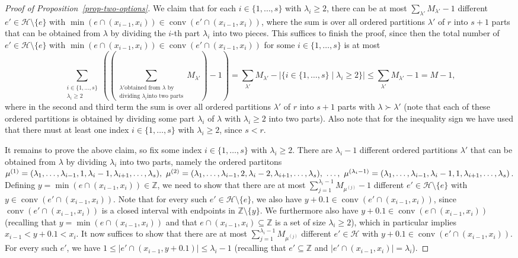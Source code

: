 \documentclass[10pt,a4paper]{amsart}
\theoremstyle{definition}
\newcommand{\su}{\subseteq}
\newcommand{\sm}{\setminus}
\newcommand{\Z}{\mathbb{Z}}
\newcommand{\HH}{\mathcal{H}}
\newcommand{\conv}{\operatorname{conv}}
\begin{document}
\begin{proof}[Proof of Proposition~\ref{prop-two-options}]
We claim that for each $i\in\{1,\dots,s\}$ with $\lambda_i\ge 2$, there can be at most $\sum_{\lambda'} M_{\lambda'}-1$ different $e'\in\HH\sm\{e\}$ with $\min(e\cap (x_{i-1},x_i))\in \conv(e'\cap (x_{i-1},x_i))$, where the sum is over all ordered partitions $\lambda'$ of $r$ into $s+1$ parts that can be obtained from $\lambda$ by dividing the $i$-th part $\lambda_i$ into two pieces. This suffices to finish the proof, since then the total number of $e'\in\HH\sm\{e\}$ with $\min(e\cap (x_{i-1},x_i))\in \conv(e'\cap (x_{i-1},x_i))$ for some $i\in\{1,\dots,s\}$ is at most
\[\sum_{\substack{i\in\{1,\dots,s\}\\\lambda_i\ge 2}}\left(\left(\sum_{\substack{\lambda'\text{obtained from }\lambda\text{ by}\\\text{dividing }\lambda_i\text{into two parts}}}\!\!M_{\lambda'}\right)-1\right)=\sum_{\lambda'} M_{\lambda'}-|\{i\in\{1,\dots,s\}\mid \lambda_i\ge 2\}|\le \sum_{\lambda'} M_{\lambda'}-1=M-1,\]
where in the second and third term the sum is over all ordered partitions $\lambda'$ of $r$ into $s+1$ parts with $\lambda\succ\lambda'$ (note that each of these ordered partitions is obtained by dividing some part $\lambda_i$ of $\lambda$ with $\lambda_i\ge 2$ into two parts). Also note that for the inequality sign we have used that there must at least one index $i\in \{1,\dots,s\}$ with $\lambda_i\ge 2$, since $s<r$.

It remains to prove the above claim, so fix some index $i\in\{1,\dots,s\}$ with $\lambda_i\ge 2$. There are $\lambda_i-1$ different ordered partitions $\lambda'$ that can be obtained from $\lambda$ by dividing $\lambda_i$ into two parts, namely the ordered partitons $\mu^{(1)}=(\lambda_1,\dots,\lambda_{i-1},1,\lambda_i-1,\lambda_{i+1},\dots,\lambda_s), \ \mu^{(2)}=(\lambda_1,\dots,\lambda_{i-1},2,\lambda_i-2,\lambda_{i+1},\dots,\lambda_s),\ \dots,\ \linebreak \mu^{(\lambda_i-1)}=(\lambda_1,\dots,\lambda_{i-1},\lambda_i-1,1,\lambda_{i+1},\dots,\lambda_s)$. Defining $y=\min(e\cap (x_{i-1},x_i))\in \Z$, we need to show that there are at most $\sum_{j=1}^{\lambda_i-1} M_{\mu^{(j)}}-1$ different $e'\in\HH\sm\{e\}$ with $y\in \conv(e'\cap (x_{i-1},x_i))$. Note that for every such $e'\in\HH\sm\{e\}$, we also have $y+0.1\in \conv(e'\cap (x_{i-1},x_i))$, since $\conv(e'\cap (x_{i-1},x_i))$ is a closed interval with endpoints in $\Z\sm\{y\}$. We furthermore also have $y+0.1\in \conv(e\cap (x_{i-1},x_i))$ (recalling that $y=\min(e\cap (x_{i-1},x_i))$ and that $e\cap (x_{i-1},x_i)\su \Z$ is a set of size $\lambda_i\ge 2$), which in particular implies $x_{i-1}<y+0.1<x_i$. It now suffices to show that there are at most $\sum_{j=1}^{\lambda_i-1} M_{\mu^{(j)}}$ different $e'\in\HH$ with $y+0.1\in \conv(e'\cap (x_{i-1},x_i))$. For every such $e'$, we have $1\le |e'\cap (x_{i-1},y+0.1)|\le \lambda_i-1$ (recalling that $e'\su \Z$ and $|e'\cap (x_{i-1},x_i)|=\lambda_i$).


\end{proof}
\end{document}
